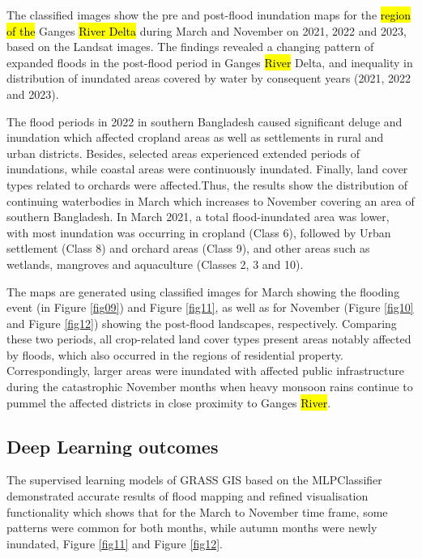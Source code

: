\documentclass[water,article,submit,pdftex,moreauthors]{Definitions/mdpi}
\begin{document}
The classified images show the pre and post-flood inundation maps for the \hl{region of the }Ganges \hl{River Delta} during March and November on 2021, 2022 and 2023, based on the Landsat images. The findings revealed a changing pattern of expanded floods in the post-flood period in Ganges \hl{River} Delta, and inequality in distribution of inundated areas covered by water by consequent years (2021, 2022 and 2023). 

The flood periods in 2022 in southern Bangladesh caused significant  deluge and inundation which affected cropland areas as well as  settlements in rural and urban districts. Besides, selected areas experienced extended periods of inundations, while coastal areas were continuously inundated. Finally, land cover types related to orchards were affected.Thus, the results show the distribution of continuing waterbodies in March which increases to November covering an area of southern Bangladesh. In March 2021, a total flood-inundated area was lower, with most inundation was occurring in cropland (Class 6), followed by Urban settlement (Class 8) and orchard areas (Class 9), and other areas such as wetlands, mangroves and aquaculture (Classes 2, 3 and 10). 

The maps are generated using classified images for March showing the flooding event (in Figure \ref{fig09}) and Figure \ref{fig11}, as well as for November (Figure \ref{fig10} and Figure \ref{fig12}) showing the post-flood landscapes, respectively. Comparing these two periods, all crop-related land cover types present areas notably affected by floods, which also occurred in the regions of residential property. Correspondingly, larger areas were inundated with affected public infrastructure during the catastrophic November months when heavy monsoon rains continue to pummel the affected districts in close proximity to Ganges \hl{River}. 

\subsection{Deep Learning outcomes}

The supervised learning models of GRASS GIS based on the MLPClassifier demonstrated accurate results of flood mapping and refined visualisation functionality which shows that for the March to November time frame, some patterns were common for both months, while autumn months were newly inundated, Figure \ref{fig11} and Figure \ref{fig12}. 
\end{document}
